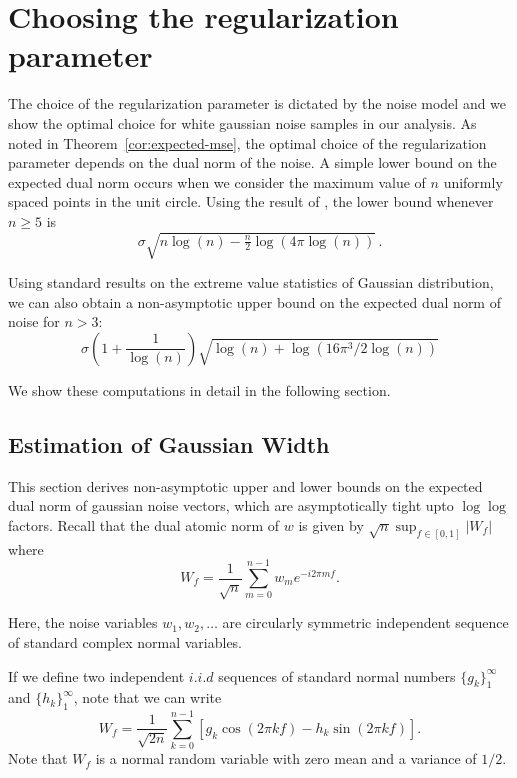 \section{Choosing the regularization parameter}\label{subsec:parameter}
The choice of the regularization parameter is dictated by the noise model and
we show the optimal choice for white gaussian noise samples in our analysis. As
noted in Theorem~\ref{cor:expected-mse}, the optimal choice of the
regularization parameter depends on the dual norm of the noise.  A simple
lower bound on the expected dual norm occurs when we consider the maximum
value of $n$ uniformly spaced points in the unit circle. Using the result of
\cite{lr76}, the lower bound whenever $n \geq 5$ is
\[
\sigma\sqrt{n\log(n) - \tfrac{n}{2} \log(4\pi\log(n))}\,.
\]

Using standard results on the extreme value statistics of Gaussian distribution,
we can also obtain a non-asymptotic upper bound on the expected dual norm of
noise for $n > 3$:
\[\sigma\left(1  + \frac{1}{\log(n)}\right)\sqrt{\log(n) + \log(16 \pi^3/2 \log(n))}\nonumber
\]

We show these computations in detail in the following section.

\subsection{Estimation of Gaussian Width}
\label{proof:dual-norm-bounds}

This section derives non-asymptotic upper and lower bounds on the expected dual norm of gaussian noise vectors, which are asymptotically tight upto $\log\log$ factors. Recall that the dual atomic norm of $w$ is given by $\sqrt{n}\sup_{f \in [0,1]}|W_f|$ where
\begin{equation*}
\label{ranproc}
W_f = \frac{1}{\sqrt{n}}\sum_{m=0}^{n-1}{w_m e^{-i2 \pi m f}}.
\end{equation*}

Here, the noise variables $w_1, w_2, \ldots$ are circularly symmetric
independent sequence of standard complex normal variables.

If we define two independent $i.i.d$ sequences of standard normal numbers $\{
g_k\}_1^\infty$ and $\{h_k\}_1^\infty$, note that we can write
\begin{equation}
W_f = \frac{1}{\sqrt{2 n}} \sum_{k=0}^{n-1} \left[ g_k \cos(2 \pi k f) - h_k \sin(2\pi k f) \right].
\end{equation}
Note that $W_f$ is a normal random variable with zero mean and a variance of
$1/2$.

